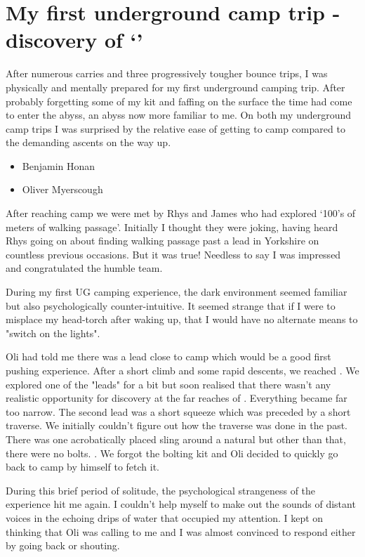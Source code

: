 \section{My first underground camp trip - discovery of `'}
After numerous carries and three progressively tougher bounce trips, I was physically and
mentally prepared for my first underground camping trip. After probably forgetting some of my kit and faffing on the surface the time had come to enter the abyss, an abyss now more familiar to me. On both my underground camp trips I was surprised by the relative ease of getting to camp compared to the demanding ascents on the way up. 

{\begin{itemize}
	\item Benjamin Honan
	\item Oliver Myerscough
\end{itemize}}

After reaching camp we were met by Rhys and James who had explored `100's of meters of walking passage'. Initially I thought they were joking, having heard Rhys going on about finding walking passage past a lead in Yorkshire on countless previous occasions. But it was true! Needless to say I was impressed and congratulated the humble team.

During my first UG camping experience, the dark environment seemed familiar but also psychologically counter-intuitive. It seemed strange that if I were to misplace my head-torch after waking up, that I would have no alternate means to "switch on the lights". 

Oli had told me there was a lead close to camp which would be a good first pushing experience. After a short climb and some rapid descents, we reached . We explored one of the "leads" for a bit but soon realised that there wasn't any realistic opportunity for discovery at the far reaches of . Everything became far too narrow. The second lead was a short squeeze which was preceded by a short traverse. We initially couldn't figure out how the traverse was done in the past. There was one acrobatically placed sling around a natural but other than that, there were no bolts. . We forgot the bolting kit and Oli decided to quickly go back to camp by himself to fetch it. 

During this brief period of solitude, the psychological strangeness of the experience hit me again. I couldn't help myself to make out the sounds of distant voices in the echoing drips of water that occupied my attention. I kept on thinking that Oli was calling to me and I was almost convinced to respond either by going back or shouting.

